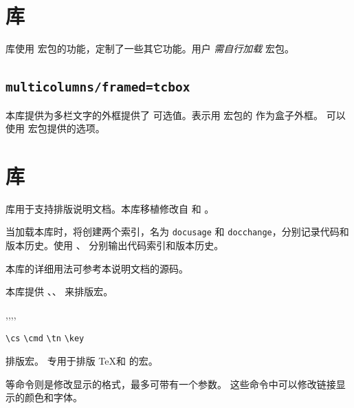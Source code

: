\documentclass[twoside]{book}
\makeatletter
\def\cus@doc@basic@format{\ifx\cus@doc@thelabel\@empty \cus@doc@thetext
  \else \hyperref[\cus@doc@thelabel]{\cus@doc@thetext\this@doc@linkinfo}\!\fi}
\def\cus@doc@cs@format#1{\hypersetup{linkcolor=cus/color/doc cs}\cus@doc@basic@format}
\let\cus@doc@cmd@format\cus@doc@cs@format
\let\cus@doc@tn@format\cus@doc@cs@format
\def\cus@doc@key@format#1{\hypersetup{linkcolor=cus/color/doc key}\cus@doc@basic@format}
\makeatother
\begin{document}
\section{库}

 库使用  宏包的功能，定制了一些其它功能。用户
\emph{需自行加载}  宏包。

\subsection{\texttt{multicolumns/framed=tcbox}}\label{sec:multicolumns/framed=tcbox}

本库提供为多栏文字的外框提供了  可选值。表示用  宏包的 
 作为盒子外框。 可以使用 
宏包提供的选项。



\section{库}

 库用于支持排版说明文档。本库移植修改自  和 。

当加载本库时，将创建两个索引，名为 \texttt{docusage} 和 \texttt{docchange}，分别记录代码和
版本历史。使用 、 分别输出代码索引和版本历史。

本库的详细用法可参考本说明文档的源码。

本库提供 、、 来排版宏。

\begin{function}{\cs,\cmd,\tn,\key,
  \cus@doc@cs@format,\cus@doc@cmd@format,\cus@doc@tn@format,\cus@doc@key@format}
\begin{syntax}
  \verb|\cs|   
  \verb|\cmd|  
  \verb|\tn|   
  \verb|\key|  
\end{syntax}
排版宏。 专用于排版 \TeX 和 \LaTeXe 的宏。

 等命令则是修改显示的格式，最多可带有一个参数。
这些命令中可以修改链接显示的颜色和字体。
\end{function}
\end{document}
